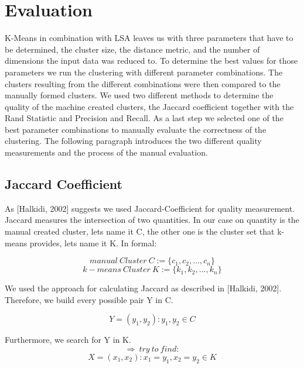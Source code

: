 \documentclass[a4paper]{IEEEtran}
\begin{document}
\section{Evaluation}
K-Means in combination with LSA leaves us with three parameters that have to be determined, the cluster size, the distance metric, and the number of dimensions the input data was reduced to. To determine the best values for those parameters we run the clustering with different parameter combinations. The clusters resulting from the different combinations were then compared to the manually formed clusters. We used two different methods to determine the quality of the machine created clusters, the Jaccard coefficient together with the Rand Statistic and Precision and Recall. As a last step we selected one of the best parameter combinations to manually evaluate the correctness of the clustering. The following paragraph introduces the two different quality measurements and the process of the manual evaluation.

\subsection{Jaccard Coefficient}
As [Halkidi, 2002] \cite{halkidi2002cluster}  suggests we used Jaccard-Coefficient for quality measurement. Jaccard measures the intersection of two quantities. In our case on quantity is the manual created cluster, lets name it C, the other one is the cluster set that k-means provides, lets name it K. In formal:

\begin{equation*}
manual~Cluster~C := \{ c_1,c_2,...,c_n \}
\end{equation*}
\begin{equation*}
k-means~Cluster~K := \{ k_1,k_2,...,k_n \}
\end{equation*}

We used the approach for calculating Jaccard as described in [Halkidi, 2002]. Therefore, we build every possible pair Y in C.

\begin{equation*}
Y= ( y_1,y_2) : y_1, y_2 \in C
\end{equation*}

Furthermore, we search for Y in K. 
\begin{equation*}
\Rightarrow ~try~to~find:
\end{equation*}
\begin{equation*}
X= ( x_1,x_2) : x_1= y_1,x_2= y_2 \in K
\end{equation*}
\end{document}
